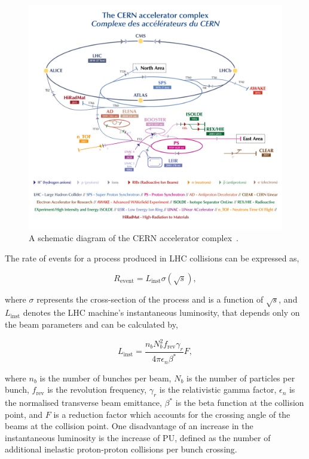 \begin{figure}[t]
    \centering
    \includegraphics[width=\textwidth]{Figures/cern.png}
    \caption[Diagram of the CERN accelerator complex.]{A schematic diagram of the CERN accelerator complex~\cite{Bartosik:2847538}.}
    \label{fig:CERN_Schematic}
\end{figure}

The rate of events for a process produced in \ac{LHC} collisions can be expressed as,

\begin{equation}
R_{\text{event}} = L_{\text{inst}} \sigma(\sqrt{s}), 
\end{equation}

where $\sigma$ represents the cross-section of the process and is a function of $\sqrt{s}$, and $L_{\text{inst}}$ denotes the \ac{LHC} machine's instantaneous luminosity, that depends only on the beam parameters and can be calculated by,

\begin{equation}
L_{\text{inst}} = \frac{n_{b}N_{b}^{2}f_{\text{rev}}\gamma_{r}}{4\pi \epsilon_{n}\beta^{*}}F,
\end{equation}

where $n_b$ is the number of bunches per beam, $N_b$ is the number of particles per bunch, $f_{\text{rev}}$ is the revolution frequency, $\gamma_r$ is the relativistic gamma factor, $\epsilon_n$ is the normalised transverse beam emittance, $\beta^*$ is the beta function at the collision point, and $F$ is a reduction factor which accounts for the crossing angle of the beams at the collision point. 
One disadvantage of an increase in the instantaneous luminosity is the increase of \ac{PU}, defined as the number of additional inelastic proton-proton collisions per bunch crossing. \\

